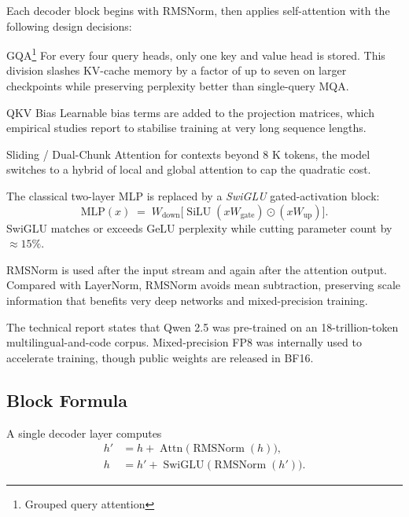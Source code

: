 Each decoder block begins with RMSNorm, then applies self-attention with the
following design decisions:

GQA\footnote{Grouped query attention} For every four query heads, only one key
and value head is stored.  This division slashes KV-cache memory by a factor of
up to seven on larger checkpoints while preserving perplexity better than
single-query MQA.%

QKV Bias Learnable bias terms are added to the projection
matrices, which empirical studies report to stabilise training at very long
sequence lengths.%

Sliding / Dual-Chunk Attention for contexts beyond 8 K tokens, the
model switches to a hybrid of local and global attention to cap the quadratic
cost.%

The classical two-layer MLP is replaced by a \emph{SwiGLU} gated-activation
block:
\[
\mathrm{MLP}(x)\;=\;W_\text{down}\bigl[\operatorname{SiLU}(xW_\text{gate})
\odot(xW_\text{up})\bigr].
\]
SwiGLU matches or exceeds GeLU perplexity while cutting parameter count by
$\approx15\%$.%

RMSNorm is used after the input stream and again after the attention output.
Compared with LayerNorm, RMSNorm avoids mean subtraction, preserving scale
information that benefits very deep networks and mixed-precision
training.%

The technical report states that Qwen 2.5 was pre-trained on an
18-trillion-token multilingual-and-code corpus.  Mixed-precision FP8 was
internally used to accelerate training, though public weights are released
in BF16.

\subsection{Block Formula}%
A single decoder layer computes
\begin{align}
h' &= h + \operatorname{Attn}\!\bigl(\operatorname{RMSNorm}(h)\bigr), \\
h  &= h' + \operatorname{SwiGLU}\!\bigl(\operatorname{RMSNorm}(h')\bigr).
\end{align}

